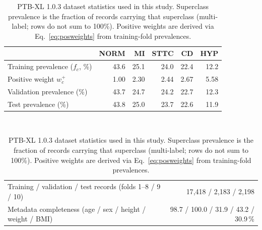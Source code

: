 \documentclass[mathematics,article,submit,pdftex]{Definitions/mdpi}
\begin{document}
\begin{table}[H]
\caption{PTB-XL 1.0.3 dataset statistics used in this study. Superclass prevalence is the fraction of records carrying that superclass (multi-label; rows do not sum to 100\%). Positive weights are derived via Eq.~\eqref{eq:posweights} from training-fold prevalences.}
\label{tab:dataset}
\centering
\small
\begin{tabular}{lrrrrr}
\toprule
 & \textbf{NORM} & \textbf{MI} & \textbf{STTC} & \textbf{CD} & \textbf{HYP} \\
\midrule
Training prevalence ($f_c$, \%)       & 43.6 & 25.1 & 24.0 & 22.4 & 12.2 \\
Positive weight $w_c^{+}$             & 1.00 & 2.30 & 2.44 & 2.67 & 5.58 \\
Validation prevalence (\%)            & 43.7 & 24.7 & 24.2 & 22.7 & 12.3 \\
Test prevalence (\%)                  & 43.8 & 25.0 & 23.7 & 22.6 & 11.9 \\
\bottomrule
\end{tabular}
\vspace{3pt}\\
\begin{tabularx}{\textwidth}{@{}>{\raggedright\arraybackslash}Xr@{}}
\toprule
Training / validation / test records (folds 1--8 / 9 / 10) & 17{,}418 / 2{,}183 / 2{,}198 \\
Metadata completeness (age / sex / height / weight / BMI) & 98.7 / 100.0 / 31.9 / 43.2 / 30.9\,\% \\
\bottomrule
\end{tabularx}
\end{table}
\end{document}
